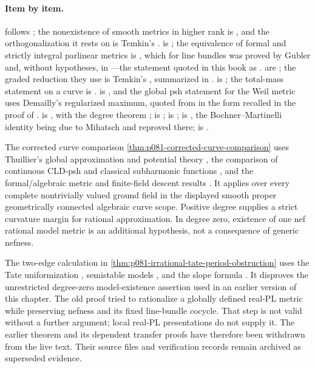 \paragraph{Item by item.}
 follows \cite[\S17.1]{CLD25}; the nonexistence of
smooth metrics in higher rank is \cite[Remark~17.1.9]{CLD25}, and the
orthogonalization it rests on is Temkin's \cite[\S2.3]{Tem16}.
 is \cite[\S\S17.2 and 17.7]{CLD25}; the
equivalence of formal and strictly integral parlinear metrics is
\cite[Proposition~17.7.5]{CLD25}, which for line bundles was proved by
Gubler and, without hypotheses, in \cite[Proposition~2.10]{GM19}---the
statement quoted in this book as .
 are
\cite[\S\S17.3--17.6]{CLD25}; the graded reduction they use is Temkin's
\cite{Tem16,Temkin2004}, summarized in .
 is \cite[\S18.1]{CLD25}; the total-mass statement on a
curve is \cite[Corollary~18.1.7]{CLD25}.   is
\cite[\S17.8]{CLD25}, and the global psh statement for the Weil metric uses
Demailly's regularized maximum, quoted from \cite[Lemma~5.18]{Dem12} in the
form recalled in the proof of .
 is \cite[\S\S18.3--18.4]{CLD25}, with the degree
theorem \cite[Theorem~18.3.11]{CLD25};  is
\cite[\S18.6]{CLD25};  is \cite[\S18.5]{CLD25};
 is \cite[\S18.7]{CLD25}, the Bochner--Martinelli
identity being due to Mihatsch and reproved there;
 is \cite[\S\S18.8--18.9]{CLD25}.

The corrected curve comparison
\cref{thm:p081-corrected-curve-comparison} uses Thuillier's global
approximation and potential theory \cite{Thu05}, the comparison of
continuous CLD-psh and classical subharmonic functions \cite{Wanner19},
and the formal/algebraic metric and finite-field descent results
\cite{GM19,GJKM19}.  It applies over every complete nontrivially valued
ground field in the displayed smooth proper geometrically connected
algebraic curve scope.  Positive degree supplies a strict curvature margin
for rational approximation.  In degree zero, existence of one nef rational
model metric is an additional hypothesis, not a consequence of generic
nefness.

The two-edge calculation in
\cref{thm:p081-irrational-tate-period-obstruction} uses the Tate
uniformization \cite{Tate95}, semistable models \cite{BL85}, and the
slope formula \cite{BPR14}.  It disproves the unrestricted degree-zero
model-existence assertion used in an earlier version of this chapter.
The old proof tried to rationalize a globally defined real-PL metric while
preserving nefness and its fixed line-bundle cocycle.  That step is not
valid without a further argument; local real-PL presentations do not
supply it.  The earlier theorem and its dependent transfer proofs have
therefore been withdrawn from the live text.  Their source files and
verification records remain archived as superseded evidence.

